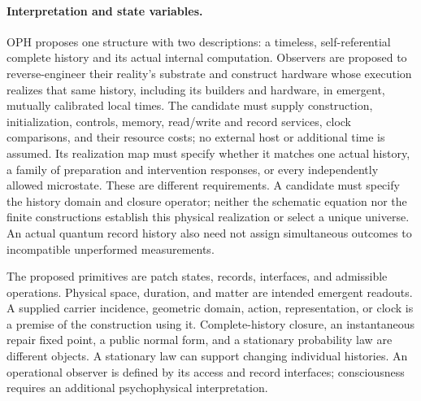 \paragraph{Interpretation and state variables.}
OPH proposes one structure with two descriptions: a timeless, self-referential
complete history and its actual internal computation. Observers are proposed
to reverse-engineer their reality's substrate and construct hardware whose
execution realizes that same history, including its builders and hardware,
in emergent, mutually calibrated local times. The candidate must supply
construction, initialization, controls, memory, read/write and record services, clock
comparisons, and their resource costs; no external host or additional time
is assumed. Its realization map must specify whether it matches one actual
history, a family of preparation and intervention responses, or every
independently allowed microstate. These are different requirements.
A candidate must specify the history domain and closure operator; neither
the schematic equation nor the finite constructions establish this physical
realization or select a unique universe.
An actual quantum record history also need not
assign simultaneous outcomes to incompatible unperformed measurements.

The proposed primitives are patch states, records, interfaces, and admissible
operations. Physical space, duration, and matter are intended emergent readouts.
A supplied carrier incidence, geometric domain, action, representation, or
clock is a premise of the construction using it. Complete-history
closure, an instantaneous repair fixed point, a public normal form, and a
stationary probability law are different objects. A stationary law can
support changing individual histories. An operational observer is defined by
its access and record interfaces; consciousness requires an additional
psychophysical interpretation.

\ifdefined\OPHOmitBasisPanel\else
